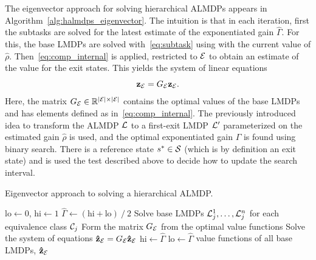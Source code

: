 The eigenvector approach for solving hierarchical ALMDPs appears in Algorithm~\ref{alg:halmdps_eigenvector}. The intuition is that in each iteration, first the subtasks are solved for the latest estimate of the exponentiated gain $\widehat\Gamma$. For this, the base LMDPs are solved with~\eqref{eq:subtask} using with the current value of $\hat\rho$. Then~\eqref{eq:comp_internal} is applied, restricted to $\mathcal{E}$ to obtain an estimate of the value for the exit states. This yields the system of linear equations
\begin{equation}
    {\bf z_{\mathcal{E}}} = G_{\mathcal{E}} {\bf z_{\mathcal{E}}}.\label{eq:eigenvector}
\end{equation}
Here, the matrix $G_{\mathcal{E}}\in\mathbb{R}^{\lvert\mathcal{E}\rvert\times \lvert\mathcal{E}\rvert}$ contains the optimal values of the base LMDPs and has elements defined as in~\eqref{eq:comp_internal}. The previously introduced idea to transform the ALMDP $\mathcal{L}$ to a first-exit LMDP $\mathcal{L}'$ parameterized on the estimated gain $\hat\rho$ is used, and  the optimal exponentiated gain $\Gamma$ is found using binary search. There is a reference state $s^*\in\mathcal{S}$ (which is by definition an exit state) and is used the test described above to decide how to update the search interval. 
\begin{algorithm}[!b]
  \caption{Eigenvector approach to solving a hierarchical ALMDP.}
  \begin{algorithmic}[1]

    \State $\text{lo}\gets 0$, $\text{hi}\gets 1$
    \State $\widehat\Gamma \gets (\text{hi} + \text{lo}) \mathbin{/} 2$
    \State Solve base LMDPs $\mathcal{L}_j^1,\ldots,\mathcal{L}_j^n$ for each equivalence class $\mathcal{C}_j$
    \State Form the matrix $G_{\mathcal{E}}$ from the optimal value functions
    \State Solve the system of equations  ${\bf \hat z_{\mathcal{E}}} = G_{\mathcal{E}} {\bf\hat z_{\mathcal{E}}}$
    \State $\text{hi}\gets \widehat\Gamma$
    \Else \State $\text{lo}\gets \widehat\Gamma$
    \EndIf
    \vspace*{3pt}
    \EndWhile
    \Return value functions of all base LMDPs, ${\bf \hat z_{\mathcal{E}}}$
  \end{algorithmic}
  \label{alg:halmdps_eigenvector}
\end{algorithm}


